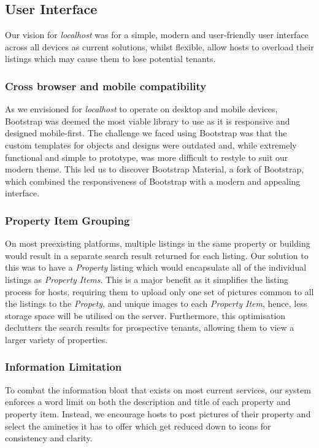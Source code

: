 \subsection{User Interface}
Our vision for \emph{localhost} was for a simple, modern and user-friendly user
interface across all devices as current solutions, whilst flexible, allow hosts
to overload their listings which may cause them to lose potential tenants.

\subsubsection{Cross browser and mobile compatibility}

As we envisioned for \emph{localhost} to operate on desktop and mobile devices,
Bootstrap was deemed the most viable library to use as it is responsive and
designed mobile-first. The challenge we faced using Bootstrap was that the custom
templates for objects and designs were outdated and, while extremely functional
and simple to prototype, was more difficult to restyle to suit our modern theme.
This led us to discover Bootstrap Material, a fork of Bootstrap, which combined
the responsiveness of Bootstrap with a modern and appealing interface.

\subsubsection{Property Item Grouping}
On most preexisting platforms, multiple listings in the same property or building
would result in a separate search result returned for each listing. Our solution
to this was to have a \emph{Property} listing which would encapsulate all of the
individual listings as \emph{Property Items}. This is a major benefit as it
simplifies the listing process for hosts, requiring them to upload only one set
of pictures common to all the listings to the \emph{Propety}, and unique images
to each \emph{Property Item}, hence, less storage space will be utilised on the
server. Furthermore, this optimisation declutters the search results for
prospective tenants, allowing them to view a larger variety of properties.

\subsubsection{Information Limitation}
To combat the information bloat that exists on most current services, our system
enforces a word limit on both the description and title of each property and
property item. Instead, we encourage hosts to post pictures of their property and
select the amineties it has to offer which get reduced down to icons for
consistency and clarity.

